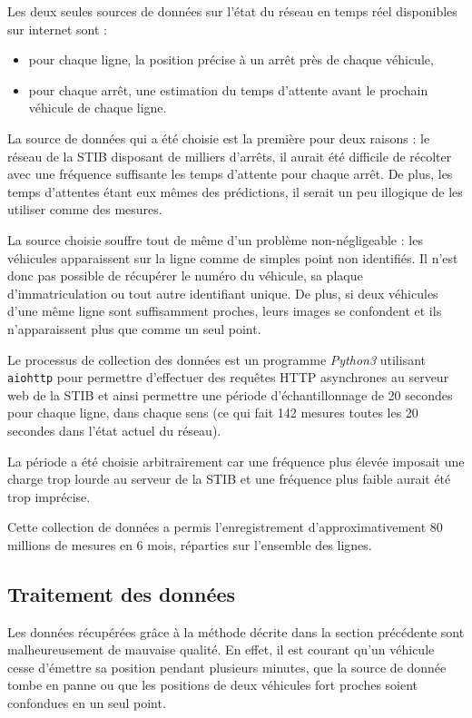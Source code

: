 \documentclass[letterpaper]{article}
\begin{document}
Les deux seules sources de données sur l'état du réseau en temps réel disponibles sur internet sont :
\begin{itemize}
    \item pour chaque ligne, la position précise à un arrêt près de chaque véhicule,
    \item pour chaque arrêt, une estimation du temps d'attente avant le prochain véhicule de chaque ligne.
\end{itemize}
\vspace{0.5em}
La source de données qui a été choisie est la première pour deux raisons : le réseau de la STIB disposant de milliers d'arrêts, il aurait été difficile de récolter avec une fréquence suffisante les temps d'attente pour chaque arrêt. De plus, les temps d'attentes étant eux mêmes des prédictions, il serait un peu illogique de les utiliser comme des mesures.

La source choisie souffre tout de même d'un problème non-négligeable : les véhicules apparaissent sur la ligne comme de simples point non identifiés. Il n'est donc pas possible de récupérer le numéro du véhicule, sa plaque d'immatriculation ou tout autre identifiant unique. De plus, si deux véhicules d'une même ligne sont suffisamment proches, leurs images se confondent et ils n'apparaissent plus que comme un seul point.

Le processus de collection des données est un programme \textit{Python3} utilisant \texttt{aiohttp} pour permettre d'effectuer des requêtes HTTP asynchrones au serveur web de la STIB et ainsi permettre une période d’échantillonnage de 20 secondes pour chaque ligne, dans chaque sens (ce qui fait 142 mesures toutes les 20 secondes dans l'état actuel du réseau).

La période a été choisie arbitrairement car une fréquence plus élevée imposait une charge trop lourde au serveur de la STIB et une fréquence plus faible aurait été trop imprécise.

Cette collection de données a permis l'enregistrement d'approximativement 80 millions de mesures en 6 mois, réparties sur l'ensemble des lignes.


\subsection{Traitement des données}

Les données récupérées grâce à la méthode décrite dans la section précédente sont malheureusement de mauvaise qualité. En effet, il est courant qu'un véhicule cesse d’émettre sa position pendant plusieurs minutes, que la source de donnée tombe en panne ou que les positions de deux véhicules fort proches soient confondues en un seul point.
\end{document}
